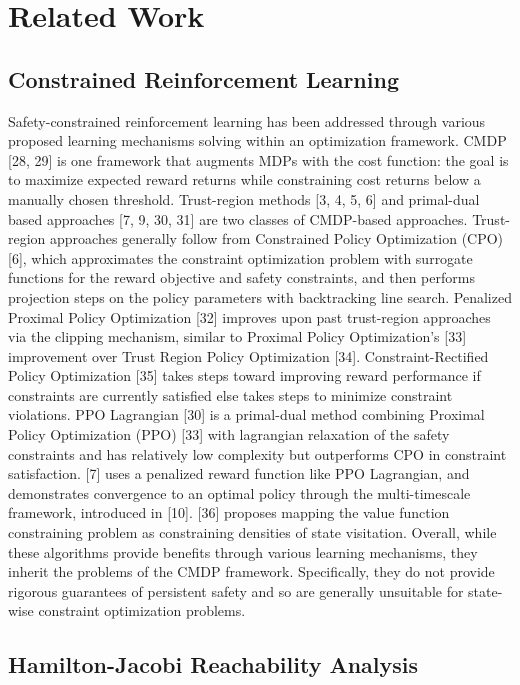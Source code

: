 \documentclass{article}
\theoremstyle{definition}
\begin{document}
\section{Related Work}

\subsection{Constrained Reinforcement Learning}

Safety-constrained reinforcement learning has been addressed through various proposed learning mechanisms solving within an optimization framework. CMDP [28, 29] is one framework that augments MDPs with the cost function: the goal is to maximize expected reward returns while constraining cost returns below a manually chosen threshold. Trust-region methods [3, 4, 5, 6] and primal-dual based approaches [7, 9, 30, 31] are two classes of CMDP-based approaches. Trust-region approaches generally follow from Constrained Policy Optimization (CPO) [6], which approximates the constraint optimization problem with surrogate functions for the reward objective and safety constraints, and then performs projection steps on the policy parameters with backtracking line search. Penalized Proximal Policy Optimization [32] improves upon past trust-region approaches via the clipping mechanism, similar to Proximal Policy Optimization's [33] improvement over Trust Region Policy Optimization [34]. Constraint-Rectified Policy Optimization [35] takes steps toward improving reward performance if constraints are currently satisfied else takes steps to minimize constraint violations. PPO Lagrangian [30] is a primal-dual method combining Proximal Policy Optimization (PPO) [33] with lagrangian relaxation of the safety constraints and has relatively low complexity but outperforms CPO in constraint satisfaction. [7] uses a penalized reward function like PPO Lagrangian, and demonstrates convergence to an optimal policy through the multi-timescale framework, introduced in [10]. [36] proposes mapping the value function constraining problem as constraining densities of state visitation. Overall, while these algorithms provide benefits through various learning mechanisms, they inherit the problems of the CMDP framework. Specifically, they do not provide rigorous guarantees of persistent safety and so are generally unsuitable for state-wise constraint optimization problems.

\subsection{Hamilton-Jacobi Reachability Analysis}
 
\end{document}
